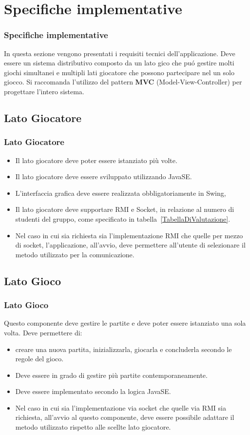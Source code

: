 \documentclass{beamer}
\begin{document}
\section{Specifiche implementative}
\begin{frame}
\frametitle{Specifiche implementative}
In questa sezione vengono presentati i requisiti tecnici
dell'applicazione.  Deve essere un sistema distributivo composto da
un lato gico che pu\'o gestire molti giochi simultanei e multipli
lati giocatore che possono partecipare nel un solo giocco. Si raccomanda
l'utilizzo del pattern \textbf{MVC} (Model-View-Controller) per
progettare l'intero sistema.
\end{frame}

\subsection{Lato Giocatore}
\begin{frame}
\frametitle{Lato Giocatore}
\begin{itemize}
\item Il lato giocatore deve poter essere istanziato pi\`u volte. 
\item Il lato giocatore deve essere sviluppato utilizzando JavaSE. 
\item L'interfaccia grafica deve essere realizzata obbligatoriamente in Swing, 
\item Il lato giocatore deve supportare RMI e Socket, in relazione al numero di studenti del gruppo, come specificato in tabella~\ref{TabellaDiValutazione}. 
\item Nel caso in cui sia richiesta sia l'implementazione RMI che
  quelle per mezzo di socket, l'applicazione, all'avvio, deve permettere
  all'utente di selezionare il metodo utilizzato per la
  comunicazione.
\end{itemize}
\end{frame}

\subsection{Lato Gioco}
\begin{frame}
\frametitle{Lato Gioco}
Questo componente deve gestire le partite e deve poter essere
istanziato una sola volta. Deve permettere di:
\begin{itemize}
\item creare una nuova partita, inizializzarla, giocarla e concluderla secondo le regole del gioco.
\item Deve essere in grado di gestire pi\`u partite
  contemporaneamente.
\item Deve essere implementato secondo la logica JavaSE.
\item Nel caso in cui sia l'implementazione via socket che quelle via
  RMI sia richiesta, all'avvio al questo componente, deve essere
  possibile adattare il metodo utilizzato rispetto alle scellte lato
  giocatore.
\end{itemize}
\end{frame}
\end{document}
